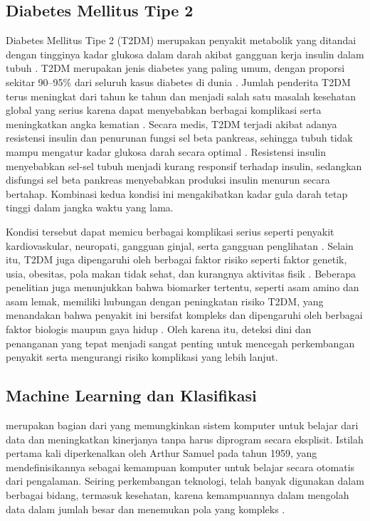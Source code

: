 \subsection{Diabetes Mellitus Tipe 2}
Diabetes Mellitus Tipe 2 (T2DM) merupakan penyakit metabolik yang ditandai dengan tingginya kadar glukosa dalam darah akibat gangguan kerja insulin dalam tubuh \cite{ref6}. T2DM merupakan jenis diabetes yang paling umum, dengan proporsi sekitar 90--95\% dari seluruh kasus diabetes di dunia \cite{ref7}. Jumlah penderita T2DM terus meningkat dari tahun ke tahun dan menjadi salah satu masalah kesehatan global yang serius karena dapat menyebabkan berbagai komplikasi serta meningkatkan angka kematian \cite{ref7,ref8}. Secara medis, T2DM terjadi akibat adanya resistensi insulin dan penurunan fungsi sel beta pankreas, sehingga tubuh tidak mampu mengatur kadar glukosa darah secara optimal \cite{ref6}. Resistensi insulin menyebabkan sel-sel tubuh menjadi kurang responsif terhadap insulin, sedangkan disfungsi sel beta pankreas menyebabkan produksi insulin menurun secara bertahap. Kombinasi kedua kondisi ini mengakibatkan kadar gula darah tetap tinggi dalam jangka waktu yang lama.

Kondisi tersebut dapat memicu berbagai komplikasi serius seperti penyakit kardiovaskular, neuropati, gangguan ginjal, serta gangguan penglihatan \cite{ref8}. Selain itu, T2DM juga dipengaruhi oleh berbagai faktor risiko seperti faktor genetik, usia, obesitas, pola makan tidak sehat, dan kurangnya aktivitas fisik \cite{ref9}. Beberapa penelitian juga menunjukkan bahwa biomarker tertentu, seperti asam amino dan asam lemak, memiliki hubungan dengan peningkatan risiko T2DM, yang menandakan bahwa penyakit ini bersifat kompleks dan dipengaruhi oleh berbagai faktor biologis maupun gaya hidup \cite{ref9}. Oleh karena itu, deteksi dini dan penanganan yang tepat menjadi sangat penting untuk mencegah perkembangan penyakit serta mengurangi risiko komplikasi yang lebih lanjut.

\subsection{Machine Learning dan Klasifikasi}
 merupakan bagian dari  yang memungkinkan sistem komputer untuk belajar dari data dan meningkatkan kinerjanya tanpa harus diprogram secara eksplisit. Istilah  pertama kali diperkenalkan oleh Arthur Samuel pada tahun 1959, yang mendefinisikannya sebagai kemampuan komputer untuk belajar secara otomatis dari pengalaman. Seiring perkembangan teknologi,  telah banyak digunakan dalam berbagai bidang, termasuk kesehatan, karena kemampuannya dalam mengolah data dalam jumlah besar dan menemukan pola yang kompleks \cite{ref1}.

